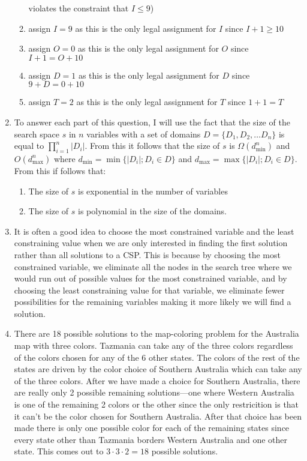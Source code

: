 \documentclass[11pt]{article}
\begin{document}
\begin{enumerate}[label=\bfseries Question \arabic*:]
\begin{enumerate}[label=\bfseries Depth \arabic*:]
    violates the constraint that \(I \le 9 \))
  \item assign \(I = 9\)
    as this is the only legal assignment for \(I\)
    since \(I + 1 \ge 10\)
  \item assign \(O = 0\)
    as this is the only legal assignment for \(O\)
    since \(I + 1 = O + 10\)
  \item assign \(D = 1\)
    as this is the only legal assignment for \(D\)
    since \(9 + D = 0 + 10 \)
  \item assign \(T = 2\)
    as this is the only legal assignment for \(T\) since \(1 + 1 = T\)
  \end{enumerate}
\item %
  To answer each part of this question, I will use the fact that the
  size of the search space \(s\)
  in \(n\)
  variables with a set of domains \(D = \{D_1, D_2, \dots D_n\}\)
  is equal to \( \prod_{i=1}^{n}{|D_i|} \).
  From this it follows that the size of \(s\)
  is \(\Omega (d_{\min} ^ n)\)
  and \( O (d_{\max}^n ) \)
  where \(d_{\min} = \min\{|D_i|; D_i \in D\}\)
  and \(d_{\max} = \max\{|D_i|; D_i \in D\}\).
  From this if follows that:
  \begin{enumerate}
  \item The size of \(s\) is exponential in the number of variables
  \item The size of \(s\) is polynomial in the size of the domains.
  \end{enumerate}
\item %
  It is often a good idea to choose the most constrained variable and
  the least constraining value when we are only interested in finding
  the first solution rather than all solutions to a CSP. This is
  because by choosing the most constrained variable, we eliminate all
  the nodes in the search tree where we would run out of possible
  values for the most constrained variable, and by choosing the least
  constraining value for that variable, we eliminate fewer
  possibilities for the remaining variables making it more likely we
  will find a solution.
\item %
  There are 18 possible solutions to the map-coloring problem for the
  Australia map with three colors. Tazmania can take any of the three
  colors regardless of the colors chosen for any of the 6 other
  states. The colors of the rest of the states are driven by the color
  choice of Southern Australia which can take any of the three colors.
  After we have made a choice for Southern Australia, there are really
  only 2 possible remaining solutions---one where Western Australia is
  one of the remaining 2 colors or the other since the only
  restricition is that it can't be the color chosen for Southern
  Australia.  After that choice has been made there is only one
  possible color for each of the remaining states since every state
  other than Tazmania borders Western Australia and one other state.
  This comes out to \(3 \cdot 3 \cdot 2 = 18 \) possible solutions.
 

\end{enumerate}

\end{document}
